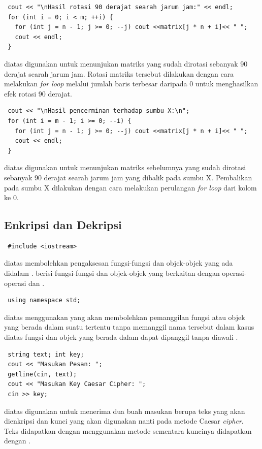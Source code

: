 \documentclass{subfiles}
\begin{document}
\begin{lstlisting}
 cout << "\nHasil rotasi 90 derajat searah jarum jam:" << endl;
 for (int i = 0; i < m; ++i) {
   for (int j = n - 1; j >= 0; --j) cout <<matrix[j * n + i]<< " ";
   cout << endl; 
 }
\end{lstlisting}
\ilz{}{\Script} diatas digunakan untuk menunjukan matriks yang sudah dirotasi sebanyak 90 derajat searah jarum jam. Rotasi matriks tersebut dilakukan dengan cara melakukan \textit{for loop} melalui jumlah baris terbesar daripada 0 untuk menghasilkan efek rotasi 90 derajat.

\begin{lstlisting}
 cout << "\nHasil pencerminan terhadap sumbu X:\n";
 for (int i = m - 1; i >= 0; --i) {
   for (int j = n - 1; j >= 0; --j) cout <<matrix[j * n + i]<< " ";
   cout << endl;
 }
\end{lstlisting}
\ilz{}{\Script} diatas digunakan untuk menunjukan matriks sebelumnya yang sudah dirotasi sebanyak 90 derajat searah jarum jam yang dibalik pada sumbu X. Pembalikan pada sumbu X dilakukan dengan cara melakukan perulangan \textit{for loop} dari kolom ke 0.

\subsection{Enkripsi dan Dekripsi}
\begin{lstlisting}
 #include <iostream>
\end{lstlisting}
\ilz{}{\Script} diatas membolehkan pengaksesan fungsi-fungsi dan objek-objek yang ada didalam {\header} {\file} . {\Header} {\file}  berisi fungsi-fungsi dan objek-objek yang berkaitan dengan operasi-operasi {\ioi} dan {\ioo} {\stream}.

\begin{lstlisting}
 using namespace std;
\end{lstlisting}
\ilz{}{\Script} diatas menggunakan {\statement}  yang akan membolehkan pemanggilan fungsi atau objek yang berada dalam suatu  tertentu tanpa memanggil nama  tersebut dalam kasus diatas fungsi dan objek yang berada dalam  dapat dipanggil tanpa diawali .

\begin{lstlisting}
 string text; int key;
 cout << "Masukan Pesan: ";
 getline(cin, text);
 cout << "Masukan Key Caesar Cipher: ";
 cin >> key;
\end{lstlisting}
\ilz{}{\Script} diatas digunakan untuk menerima dua buah masukan berupa teks yang akan dienkripsi dan kunci yang akan digunakan nanti pada metode Caesar \textit{cipher}. Teks didapatkan dengan menggunakan metode  sementara kuncinya didapatkan dengan .
\end{document}
